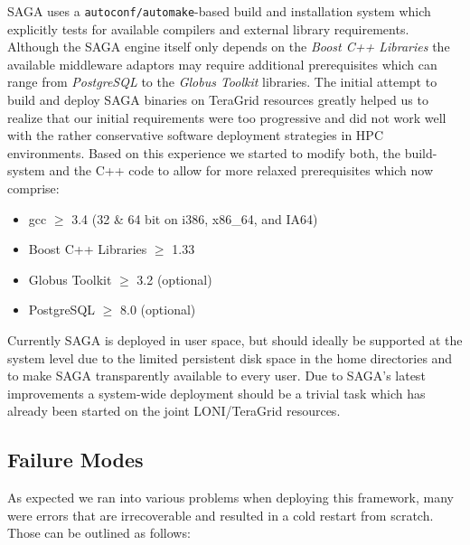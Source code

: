 \documentclass[conference,final]{IEEEtran}
\newcommand{\jha}[0]{}
\begin{document}
SAGA uses a \texttt{autoconf/automake}-based build and installation system
which explicitly tests for available compilers and external library requirements.
Although the SAGA engine itself only depends on the \textit{Boost C++ Libraries} the 
available middleware adaptors may require additional prerequisites which
can range from \textit{PostgreSQL} to the \textit{Globus Toolkit} libraries. The initial attempt
to build and deploy SAGA binaries on TeraGrid resources greatly helped us to realize
that our initial requirements were too progressive and did not work well with 
the rather conservative software deployment strategies in HPC environments.
Based on this experience we started to modify both, the build-system and the
C++ code to allow for more relaxed prerequisites which now comprise:

\begin{itemize}
\item{gcc $\geq$ 3.4 (32 \& 64 bit on i386, x86\_64, and IA64)}
\item{Boost C++ Libraries $\geq$ 1.33}
\item{Globus Toolkit $\geq$ 3.2 (optional)}
\item{PostgreSQL $\geq$ 8.0 (optional)}
\end{itemize}

Currently SAGA is deployed in user space, but should ideally be supported at
the system level due to the limited persistent disk space in the
home directories and to make SAGA transparently available to every user. 
Due to SAGA's latest improvements a system-wide deployment should be a trivial
task which has already been started on the joint LONI/TeraGrid resources.



\subsection{Failure Modes}
As expected we ran into various problems when deploying this framework, many were
errors that are irrecoverable and resulted in a cold restart from scratch. Those can
be outlined as follows:
\end{document}
